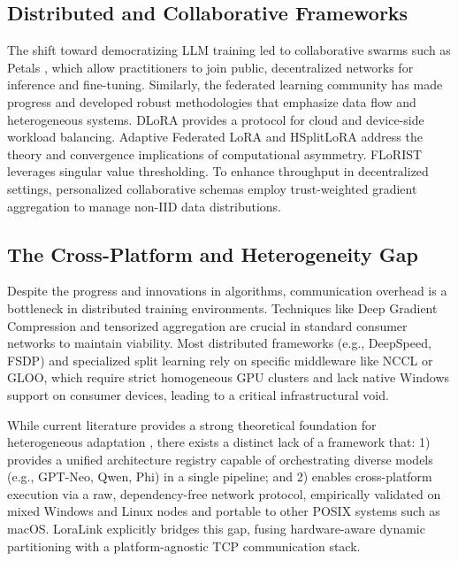 \documentclass{ieeeaccess}
\begin{document}
\subsection{Distributed and Collaborative Frameworks}
The shift toward democratizing LLM training led to collaborative swarms such as Petals \cite{borzunov2023petals}, which allow practitioners to join public, decentralized networks for inference and fine-tuning. Similarly, the federated learning community has made progress and developed robust methodologies that emphasize data flow and heterogeneous systems. DLoRA \cite{gao2024dlora} provides a protocol for cloud and device-side workload balancing. Adaptive Federated LoRA \cite{hou2025adaptive} and HSplitLoRA \cite{lin2025hsplitlora} address the theory and convergence implications of computational asymmetry. FLoRIST \cite{ramesh2025florist} leverages singular value thresholding. To enhance throughput in decentralized settings, personalized collaborative schemas \cite{wagner2024personalized} employ trust-weighted gradient aggregation to manage non-IID data distributions.

\subsection{The Cross-Platform and Heterogeneity Gap}
Despite the progress and innovations in algorithms, communication overhead is a bottleneck in distributed training environments. Techniques like Deep Gradient Compression \cite{lin2018deep} and tensorized aggregation \cite{ghiasvand2024communication} are crucial in standard consumer networks to maintain viability. Most distributed frameworks (e.g., DeepSpeed, FSDP) and specialized split learning rely on specific middleware like NCCL or GLOO, which require strict homogeneous GPU clusters and lack native Windows support on consumer devices, leading to a critical infrastructural void.

While current literature provides a strong theoretical foundation for heterogeneous adaptation \cite{lin2025hsplitlora}, there exists a distinct lack of a framework that: 1) provides a unified architecture registry capable of orchestrating diverse models (e.g., GPT-Neo, Qwen, Phi) in a single pipeline; and 2) enables cross-platform execution via a raw, dependency-free network protocol, empirically validated on mixed Windows and Linux nodes and portable to other POSIX systems such as macOS. LoraLink explicitly bridges this gap, fusing hardware-aware dynamic partitioning with a platform-agnostic TCP communication stack.
\end{document}
